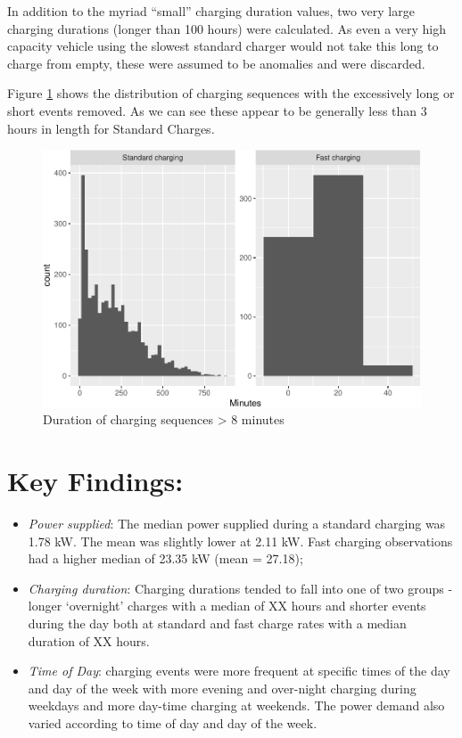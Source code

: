 \documentclass[]{article}
\providecommand{\tightlist}{%
  \setlength{\itemsep}{0pt}\setlength{\parskip}{0pt}}
\begin{document}
In addition to the myriad ``small'' charging duration values, two very
large charging durations (longer than 100 hours) were calculated. As
even a very high capacity vehicle using the slowest standard charger
would not take this long to charge from empty, these were assumed to be
anomalies and were discarded.

Figure \ref{fig:longDuration} shows the distribution of charging
sequences with the excessively long or short events removed. As we can
see these appear to be generally less than 3 hours in length for
Standard Charges.

\begin{figure}
\centering
\includegraphics{EVBB_report_files/figure-latex/longDuration-1.pdf}
\caption{\label{fig:longDuration}Duration of charging sequences
\textgreater{} 8 minutes}
\end{figure}

\section{Key Findings:}\label{key-findings}

\begin{itemize}
\tightlist
\item
  \emph{Power supplied}: The median power supplied during a standard
  charging was 1.78 kW. The mean was slightly lower at 2.11 kW. Fast
  charging observations had a higher median of 23.35 kW (mean = 27.18);
\item
  \emph{Charging duration}: Charging durations tended to fall into one
  of two groups - longer `overnight' charges with a median of XX hours
  and shorter events during the day both at standard and fast charge
  rates with a median duration of XX hours.
\item
  \emph{Time of Day}: charging events were more frequent at specific
  times of the day and day of the week with more evening and over-night
  charging during weekdays and more day-time charging at weekends. The
  power demand also varied according to time of day and day of the week.
\end{itemize}
\end{document}
